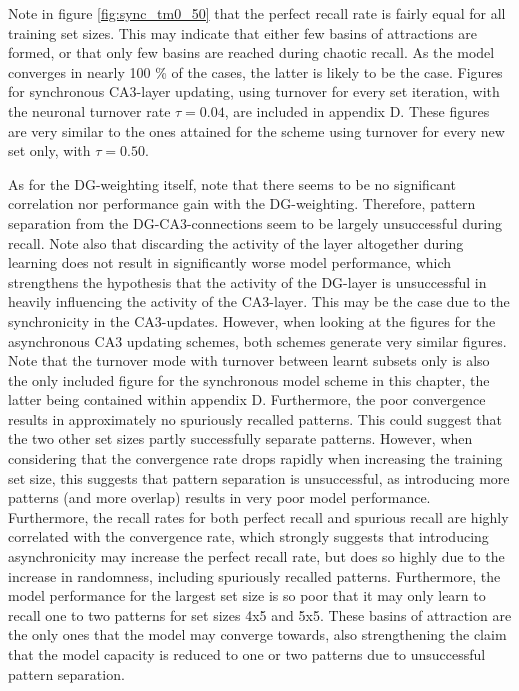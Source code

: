 Note in figure \ref{fig:sync_tm0_50} that the perfect recall rate is fairly equal for all training set sizes. This may indicate that either few basins of attractions are formed, or that only few basins are reached during chaotic recall. As the model converges in nearly 100 \% of the cases, the latter is likely to be the case. Figures for synchronous CA3-layer updating, using turnover for every set iteration, with the neuronal turnover rate $\tau=0.04$, are included in appendix D. These figures are very similar to the ones attained for the scheme using turnover for every new set only, with $\tau=0.50$.

As for the DG-weighting itself, note that there seems to be no significant correlation nor performance gain with the DG-weighting. Therefore, pattern separation from the DG-CA3-connections seem to be largely unsuccessful during recall.
Note also that discarding the activity of the layer altogether during learning does not result in significantly worse model performance, which strengthens the hypothesis that the activity of the DG-layer is unsuccessful in heavily influencing the activity of the CA3-layer.
This may be the case due to the synchronicity in the CA3-updates.
However, when looking at the figures for the asynchronous CA3 updating schemes, both schemes generate very similar figures. Note that the turnover mode with turnover between learnt subsets only is also the only included figure for the synchronous model scheme in this chapter, the latter being contained within appendix D.
Furthermore, the poor convergence results in approximately no spuriously recalled patterns. This could suggest that the two other set sizes partly successfully separate patterns. However, when considering that the convergence rate drops rapidly when increasing the training set size, this suggests that pattern separation is unsuccessful, as introducing more patterns (and more overlap) results in very poor model performance. Furthermore, the recall rates for both perfect recall and spurious recall are highly correlated with the convergence rate, which strongly suggests that introducing asynchronicity may increase the perfect recall rate, but does so highly due to the increase in randomness, including spuriously recalled patterns. Furthermore, the model performance for the largest set size is so poor that it may only learn to recall one to two patterns for set sizes 4x5 and 5x5. These basins of attraction are the only ones that the model may converge towards, also strengthening the claim that the model capacity is reduced to one or two patterns due to unsuccessful pattern separation.


